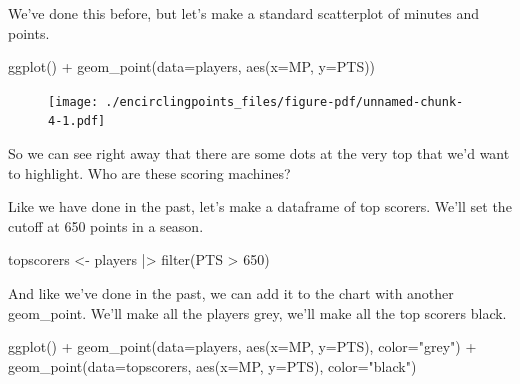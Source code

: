 \documentclass[
  letterpaper,
  DIV=11,
  numbers=noendperiod]{scrreprt}
\newenvironment{Shaded}{\begin{snugshade}}{\end{snugshade}}
\newcommand{\AttributeTok}[1]{\textcolor[rgb]{0.40,0.45,0.13}{#1}}
\newcommand{\DecValTok}[1]{\textcolor[rgb]{0.68,0.00,0.00}{#1}}
\newcommand{\FunctionTok}[1]{\textcolor[rgb]{0.28,0.35,0.67}{#1}}
\newcommand{\NormalTok}[1]{\textcolor[rgb]{0.00,0.23,0.31}{#1}}
\newcommand{\OtherTok}[1]{\textcolor[rgb]{0.00,0.23,0.31}{#1}}
\newcommand{\SpecialCharTok}[1]{\textcolor[rgb]{0.37,0.37,0.37}{#1}}
\newcommand{\StringTok}[1]{\textcolor[rgb]{0.13,0.47,0.30}{#1}}
\begin{document}
We've done this before, but let's make a standard scatterplot of minutes
and points.

\begin{Shaded}
\begin{Highlighting}[]
\FunctionTok{ggplot}\NormalTok{() }\SpecialCharTok{+} \FunctionTok{geom\_point}\NormalTok{(}\AttributeTok{data=}\NormalTok{players, }\FunctionTok{aes}\NormalTok{(}\AttributeTok{x=}\NormalTok{MP, }\AttributeTok{y=}\NormalTok{PTS))}
\end{Highlighting}
\end{Shaded}

\begin{figure}[H]

{\centering \texttt{[image: ./encirclingpoints\_files/figure-pdf/unnamed-chunk-4-1.pdf]}

}

\end{figure}

So we can see right away that there are some dots at the very top that
we'd want to highlight. Who are these scoring machines?

Like we have done in the past, let's make a dataframe of top scorers.
We'll set the cutoff at 650 points in a season.

\begin{Shaded}
\begin{Highlighting}[]
\NormalTok{topscorers }\OtherTok{\textless{}{-}}\NormalTok{ players }\SpecialCharTok{|\textgreater{}} \FunctionTok{filter}\NormalTok{(PTS }\SpecialCharTok{\textgreater{}} \DecValTok{650}\NormalTok{)}
\end{Highlighting}
\end{Shaded}

And like we've done in the past, we can add it to the chart with another
geom\_point. We'll make all the players grey, we'll make all the top
scorers black.

\begin{Shaded}
\begin{Highlighting}[]
\FunctionTok{ggplot}\NormalTok{() }\SpecialCharTok{+} 
  \FunctionTok{geom\_point}\NormalTok{(}\AttributeTok{data=}\NormalTok{players, }\FunctionTok{aes}\NormalTok{(}\AttributeTok{x=}\NormalTok{MP, }\AttributeTok{y=}\NormalTok{PTS), }\AttributeTok{color=}\StringTok{"grey"}\NormalTok{) }\SpecialCharTok{+}
  \FunctionTok{geom\_point}\NormalTok{(}\AttributeTok{data=}\NormalTok{topscorers, }\FunctionTok{aes}\NormalTok{(}\AttributeTok{x=}\NormalTok{MP, }\AttributeTok{y=}\NormalTok{PTS), }\AttributeTok{color=}\StringTok{"black"}\NormalTok{)}
\end{Highlighting}
\end{Shaded}
\end{document}
